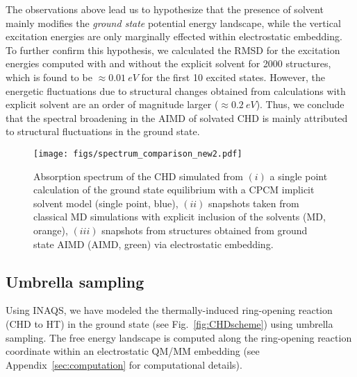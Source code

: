 \documentclass[journal=jctcce,manuscript=article,layout=traditional]{achemso}
\newcommand{\fig}[1]{Fig.~\ref{#1}}
\begin{document}
The observations above lead us to hypothesize that the presence of solvent mainly modifies the \emph{ground state} potential energy landscape, while the vertical excitation energies are only marginally effected within electrostatic embedding. To further confirm this hypothesis, we calculated the RMSD for the excitation energies computed with and without the explicit solvent for 2000 structures, which is found to be  $\approx0.01~eV$ for the first 10 excited states. However, the energetic fluctuations due to structural changes obtained from calculations with explicit solvent are an order of magnitude larger ($\approx0.2~eV$). Thus, we conclude that the spectral broadening in the AIMD of solvated CHD is mainly attributed to structural fluctuations in the ground state.
%

\begin{figure}
    \centering
%
     \texttt{[image: figs/spectrum\_comparison\_new2.pdf]}
    \caption{Absorption spectrum of the CHD simulated from $(i)$ a single point calculation of the ground state equilibrium with a CPCM implicit solvent model (single point, blue), $(ii)$ snapshots taken from classical MD simulations with explicit inclusion of the solvents (MD, orange), $(iii)$ snapshots from structures obtained from ground state AIMD (AIMD, green) via electrostatic embedding.
    }
    \label{fig:spectrum}
\end{figure}

%
%
%
%
%
%
%
%



%
%
%
%

%
%
%
%

\subsection{Umbrella sampling}
Using INAQS, we have modeled the thermally-induced ring-opening reaction (CHD to HT) in the ground state (see \fig{fig:CHDscheme}) using umbrella sampling\cite{chandler:statmech, gwham}. The free energy landscape is computed along the ring-opening reaction coordinate within an electrostatic QM/MM embedding (see Appendix~\ref{sec:computation} for computational details). 
\end{document}
